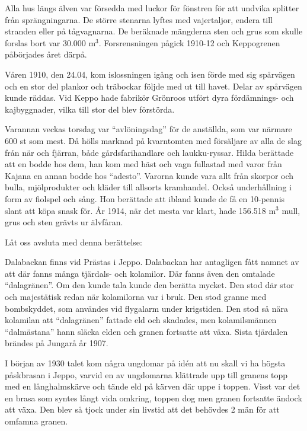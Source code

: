 Alla hus längs älven var försedda med luckor för fönstren för att undvika splitter från sprängningarna. De större stenarna lyftes med vajertaljor, endera till stranden eller på tågvagnarna. De beräknade mängderna sten och grus som  skulle forslas bort var 30.000 m$^3$. Forsrensningen pågick 1910-12 och Keppogrenen påbörjades året därpå.

Våren 1910, den 24.04, kom islossningen igång och isen förde med sig spårvägen och en stor del plankor och träbockar följde med ut till havet. Delar av spårvägen kunde räddas. Vid Keppo hade fabrikör Grönroos utfört dyra fördämnings- och kajbyggnader, vilka till stor del blev förstörda.

Varannan veckas torsdag var ``avlöningsdag'' för de anställda, som var närmare 600 st som mest. Då hölls marknad på kvarntomten med försäljare av alla de slag från när och fjärran, både gårdsfarihandlare och laukku-ryssar. Hilda berättade att en bodde hos dem, han kom med häst och vagn fullastad med varor från Kajana en annan bodde hos ``adesto''. Varorna kunde vara allt från skorpor och bulla, mjölprodukter och kläder till 	allsorts kramhandel. Också underhållning i form av fiolspel och sång. Hon berättade att ibland kunde de få en 10-pennis slant att köpa snask för. År 1914, när det mesta var klart, hade 156.518 m$^3$ mull, grus och sten grävts ur älvfåran.




Låt oss avsluta med denna berättelse:


Dalabackan finns vid Prästas i Jeppo. Dalabackan har antagligen fått namnet av att där fanns många tjärdals- och kolamilor. Där fanns även den omtalade ``dalagränen''. Om den kunde tala kunde den berätta mycket.
Den stod där stor och majestätisk redan när kolamilorna var i bruk. Den stod granne med bombskyddet, som användes vid flygalarm under krigstiden. Den stod så nära kolamilan att ``dalagränen'' fattade eld och skadades, men kolamilsmännen ``dalmästana'' hann släcka elden och granen fortsatte att växa. Sista tjärdalen brändes på Jungarå år 1907.

I början av 1930 talet kom några ungdomar på idén att nu skall vi ha högsta påskbrasan i Jeppo, varvid en av ungdomarna klättrade upp till granens topp med en långhalmskärve och tände eld på kärven där uppe i toppen. Visst var det en brasa som syntes långt vida omkring, toppen dog men granen fortsatte ändock att växa. Den blev så tjock under sin livstid att det behövdes 2 män för att omfamna granen.

